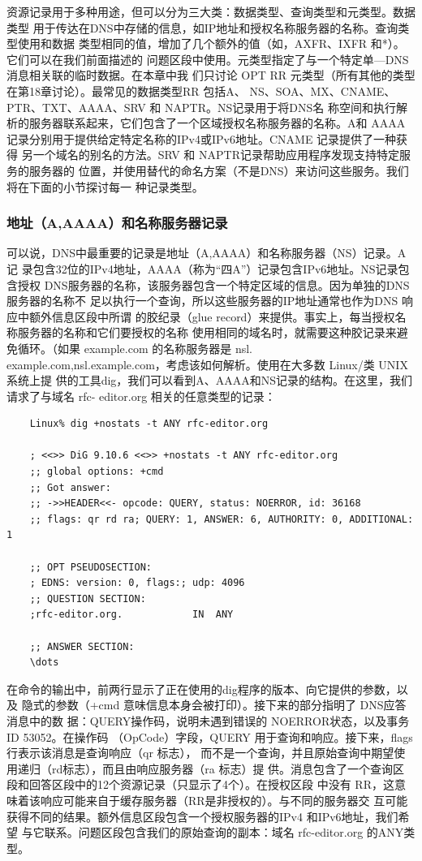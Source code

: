 资源记录用于多种用途，但可以分为三大类：数据类型、查询类型和元类型。数据类型
用于传达在DNS中存储的信息，如IP地址和授权名称服务器的名称。查询类型使用和数据
类型相同的值，增加了几个额外的值（如，AXFR、IXFR 和*）。它们可以在我们前面描述的
问题区段中使用。元类型指定了与一个特定单—DNS 消息相关联的临时数据。在本章中我
们只讨论 OPT RR 元类型（所有其他的类型在第18章讨论）。最常见的数据类型RR 包括A、
NS、SOA、MX、CNAME、PTR、TXT、AAAA、SRV 和 NAPTR。NS记录用于将DNS名
称空间和执行解析的服务器联系起来，它们包含了一个区域授权名称服务器的名称。A和
AAAA记录分别用于提供给定特定名称的IPv4或IPv6地址。CNAME 记录提供了一种获得
另一个域名的别名的方法。SRV 和 NAPTR记录帮助应用程序发现支持特定服务的服务器的
位置，并使用替代的命名方案（不是DNS）来访问这些服务。我们将在下面的小节探讨每一
种记录类型。

\subsubsection{地址（A,AAAA）和名称服务器记录}

可以说，DNS中最重要的记录是地址（A,AAAA）和名称服务器（NS）记录。A记
录包含32位的IPv4地址，AAAA（称为“四A”）记录包含IPv6地址。NS记录包含授权
DNS服务器的名称，该服务器包含一个特定区域的信息。因为单独的DNS服务器的名称不
足以执行一个查询，所以这些服务器的IP地址通常也作为DNS 响应中额外信息区段中所谓
的胶纪录（glue record）来提供。事实上，每当授权名称服务器的名称和它们要授权的名称
使用相同的域名时，就需要这种胶记录来避免循环。（如果 example.com 的名称服务器是 nsl.
example.com,nsl.example.com，考虑该如何解析。使用在大多数 Linux/类 UNIX 系统上提
供的工具dig，我们可以看到A、AAAA和NS记录的结构。在这里，我们请求了与域名 rfc-
editor.org 相关的任意类型的记录：

\begin{verbatim}
    Linux% dig +nostats -t ANY rfc-editor.org
    
    ; <<>> DiG 9.10.6 <<>> +nostats -t ANY rfc-editor.org
    ;; global options: +cmd
    ;; Got answer:
    ;; ->>HEADER<<- opcode: QUERY, status: NOERROR, id: 36168
    ;; flags: qr rd ra; QUERY: 1, ANSWER: 6, AUTHORITY: 0, ADDITIONAL: 1
    
    ;; OPT PSEUDOSECTION:
    ; EDNS: version: 0, flags:; udp: 4096
    ;; QUESTION SECTION:
    ;rfc-editor.org.			IN	ANY

    ;; ANSWER SECTION:
    \dots
\end{verbatim}

在命令的输出中，前两行显示了正在使用的dig程序的版本、向它提供的参数，以及
隐式的参数（+cmd 意味信息本身会被打印）。接下来的部分指明了 DNS应答消息中的数
据：QUERY操作码，说明未遇到错误的 NOERROR状态，以及事务 ID 53052。在操作码
（OpCode）字段，QUERY 用于查询和响应。接下来，flags 行表示该消息是查询响应（qr 标志），
而不是一个查询，并且原始查询中期望使用递归（rd标志），而且由响应服务器（ra 标志）提
供。消息包含了一个查询区段和回答区段中的12个资源记录（只显示了4个）。在授权区段
中没有 RR，这意味着该响应可能来自于缓存服务器（RR是非授权的）。与不同的服务器交
互可能获得不同的结果。额外信息区段包含一个授权服务器的IPv4 和IPv6地址，我们希望
与它联系。问题区段包含我们的原始查询的副本：域名 rfc-editor.org 的ANY类型。

